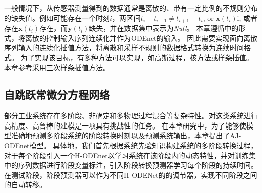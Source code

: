 一般情况下，从传感器测量得到的数据通常是离散的、带有一定比例的不规则分布的缺失值。例如可能存在一个时刻$i$，两区间$t_i-t_{i-1} \neq t_{i+1}-t_{i}$, or $\boldsymbol x(t_i)$i, 或者存在$\boldsymbol x(t_i)$存在，而$\boldsymbol y(t_i)$缺失，并在数据集中表示为\textit{Null}。
本章遵循\cite{zhong2019symplectic,kidger2020neural}中的形式，将离散的控制输入序列连续化并作为ODEnet的输入。
因此需要实现面向离散序列输入的连续化插值方法，将离散和采样不规则的数据格式转换为连续时间格式。
为了实现该目标，有多种方法可以实现，如高斯过程\cite{li2016scalable}，核方法\cite{shukla2018interpolation}或样条插值\cite{kidger2020neural}。本章参考\cite{kidger2020neural}采用三次样条插值方法。



\subsection{自跳跃常微分方程网络}
\label{sec:dfa-odenet}
部分工业系统存在多阶段、非确定和多物理过程混合等复杂特性。对这类系统进行高精度、高鲁棒的建模是一项具有挑战性的任务。
在本章研究中，为了能够使模型准确地预测多阶段系统的阶段转换时刻以及预测系统输出，本章提出了AJ-ODEnet模型。
具体地，我们首先根据系统先验知识构建系统的多阶段转换过程，对于每个阶段引入一个H-ODEnet以学习系统在该阶段内的动态特性，并对训练集中的序列数据进行阶段变量标注，引入阶段转换预测器学习每个阶段的持续时间。
在测试阶段，阶段预测器可以作为不同H-ODENet的的调节器，实现不同阶段之间的自动转移。

